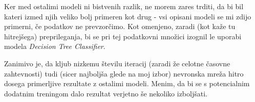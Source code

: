 \documentclass{article}
\begin{document}
Ker med ostalimi modeli ni bistvenih razlik, ne morem zares trditi, da bi bil kateri izmed njih veliko bolj primeren kot drug - vsi opisani modeli se mi zdijo primerni, če podatkov ne prevzorčimo. 
Kot omenjeno, zaradi (kot kaže tu hitrejšega) preprileganja, bi se pri tej podatkovni množici izognil le uporabi modela \textit{Decision Tree Classifier}. 

Zanimivo je, da kljub nizkemu številu iteracij (zaradi že celotne časovne zahtevnosti) tudi (sicer najboljša glede na moj izbor) nevronska mreža hitro dosega primerljive rezultate z ostalimi modeli. 
Menim, da bi se s potencialnim dodatnim treningom dalo rezultat verjetno še nekoliko izboljšati.
\end{document}
